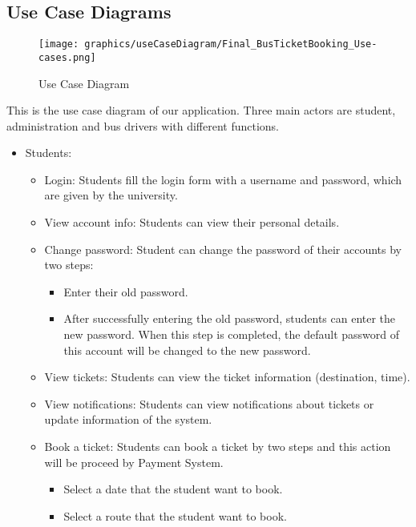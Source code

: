 \subsection{Use Case Diagrams}
    \begin{figure}[H]
        \centering
        \texttt{[image: graphics/useCaseDiagram/Final\_BusTicketBooking\_Use-cases.png]}
        \caption{Use Case Diagram}
        \label{fig:usecasediagram}
    \end{figure}
\noindent This is the use case diagram of our application. Three main actors are student, administration and bus drivers with different functions. 
\begin{itemize}
    \item Students:
        \begin{itemize}
            \item Login: Students fill the login form with a username and password, which are given by the university. 
            \item View account info: Students can view their personal details.
            \item Change password: Student can change the password of their accounts by two steps:
                \begin{itemize}
                    \item Enter their old password. 
                    \item After successfully entering the old password, students can enter the new password. When this step is completed, the default password of this account will be changed to the new password. 
                \end{itemize}
            \item View tickets: Students can view the ticket information (destination, time).
            \item View notifications: Students can view notifications about tickets or update information of the system. 
            \item Book a ticket: Students can book a ticket by two steps and this action will be proceed by Payment System.
                \begin{itemize}
                    \item Select a date that the student want to book. 
                    \item Select a route that the student want to book.
                \end{itemize}
        \end{itemize}

\end{itemize}
